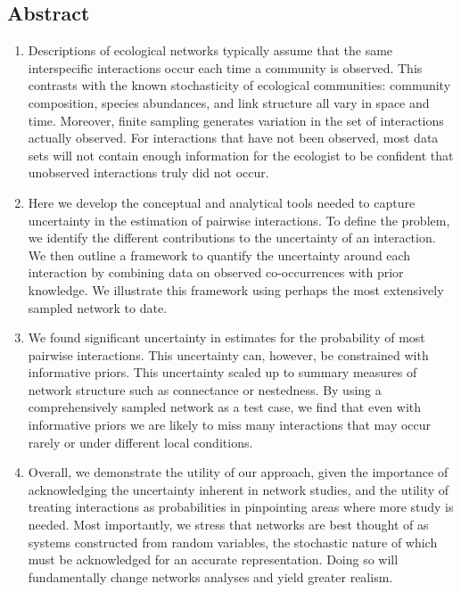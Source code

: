 \documentclass[12pt]{article}
\begin{document}
\begin{spacing}{2.0}

\section*{Abstract}

  \begin{enumerate}

    \item  Descriptions of ecological networks typically assume that the same interspecific interactions occur each time a community is observed. This contrasts with the known stochasticity of ecological communities: community composition, species abundances, and link structure all vary in space and time. Moreover, finite sampling generates variation in the set of interactions actually observed. For interactions that have not been observed, most data sets will not contain enough information for the ecologist to be confident that unobserved interactions truly did not occur.
    \item Here we develop the conceptual and analytical tools needed to capture uncertainty in the estimation of pairwise interactions. To define the problem, we identify the different contributions to the uncertainty of an interaction. We then outline a framework to quantify the uncertainty around each interaction by combining data on observed co-occurrences with prior knowledge. We illustrate this framework using perhaps the most extensively sampled network to date. 
    \item We found significant uncertainty in estimates for the probability of most pairwise interactions. This uncertainty can, however, be constrained with informative priors. This uncertainty scaled up to summary measures of network structure such as connectance or nestedness. By using a comprehensively sampled network as a test case, we find that even with informative priors we are likely to miss many interactions that may occur rarely or under different local conditions. 
    \item Overall, we demonstrate the utility of our approach, given the importance of acknowledging the uncertainty inherent in network studies, and the utility of treating interactions as probabilities in pinpointing areas where more study is needed. Most importantly, we stress that networks are best thought of as systems constructed from random variables, the stochastic nature of which must be acknowledged for an accurate representation. Doing so will fundamentally change networks analyses and yield greater realism.
\end{enumerate}



\end{spacing}
\end{document}
